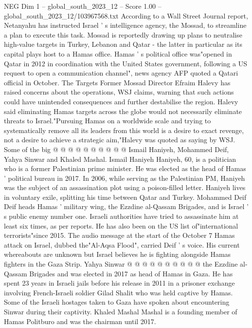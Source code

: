 \begin{textsample}{NEG Dim 1 – global\_south\_2023\_12 – Score 1.00 – global\_south\_2023\_12/103967568.txt}  \label{ex:f1_neg_415}
According to a Wall Street Journal report, Netanyahu has instructed Israel ' s intelligence agency, the Mossad, to streamline a plan to execute this task.
Mossad is reportedly drawing up plans to neutralise high-value targets in Turkey, Lebanon and Qatar - the latter in particular as its capital plays host to a Hamas office.
Hamas ' s political office was"opened in Qatar in 2012 in coordination with the United States government, following a US request to open a communication channel", news agency AFP quoted a Qatari official in October.
The Targets Former Mossad Director Efraim Halevy has raised concerns about the operations, WSJ claims, warning that such actions could have unintended consequences and further destabilise the region.
Halevy said eliminating Hamas targets across the globe would not necessarily eliminate threats to Israel."Pursuing Hamas on a worldwide scale and trying to systematically remove all its leaders from this world is a desire to exact revenge, not a desire to achieve a strategic aim,"Halevy was quoted as saying by WSJ.
Some of the big @ @ @ @ @ @ @ @ @ @ Ismail Haniyeh, Mohammed Deif, Yahya Sinwar and Khaled Mashal.
Ismail Haniyeh Haniyeh, 60, is a politician who is a former Palestinian prime minister.
He was elected as the head of Hamas ' political bureau in 2017.
In 2006, while serving as the Palestinian PM, Haniyeh was the subject of an assassination plot using a poison-filled letter.
Haniyeh lives in voluntary exile, splitting his time between Qatar and Turkey.
Mohammed Deif Deif heads Hamas ' military wing, the Ezzdine al-Qassam Brigades, and is Israel ' s public enemy number one.
Israeli authorities have tried to assassinate him at least six times, as per reports.
He has also been on the US list of"international terrorists"since 2015.
The audio message at the start of the October 7 Hamas attack on Israel, dubbed the"Al-Aqsa Flood", carried Deif ' s voice.
His current whereabouts are unknown but Israel believes he is fighting alongside Hamas fighters in the Gaza Strip.
Yahya Sinwar @ @ @ @ @ @ @ @ @ @ the Ezzdine al-Qassam Brigades and was elected in 2017 as head of Hamas in Gaza.
He has spent 23 years in Israeli jails before his release in 2011 in a prisoner exchange involving French-Israeli soldier Gilad Shalit who was held captive by Hamas.
Some of the Israeli hostages taken to Gaza have spoken about encountering Sinwar during their captivity.
Khaled Mashal Mashal is a founding member of Hamas Politburo and was the chairman until 2017.

\end{textsample}
